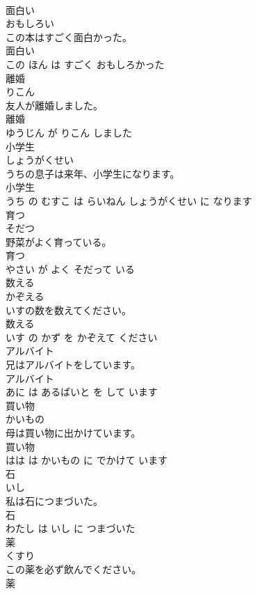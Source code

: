 \documentclass[8pt]{extreport}
\begin{document}
\begin{CJK}{UTF8}{min}
\\	面白い	
\\	おもしろい			
\\	この本はすごく面白かった。	
\\	面白い 
\\	この ほん は すごく おもしろかった			
\\	離婚	
\\	りこん			
\\	友人が離婚しました。	
\\	離婚 
\\	ゆうじん が りこん しました			
\\	小学生	
\\	しょうがくせい			
\\	うちの息子は来年、小学生になります。	
\\	小学生 
\\	うち の むすこ は らいねん しょうがくせい に なります			
\\	育つ	
\\	そだつ			
\\	野菜がよく育っている。	
\\	育つ 
\\	やさい が よく そだって いる			
\\	数える	
\\	かぞえる			
\\	いすの数を数えてください。	
\\	数える 
\\	いす の かず を かぞえて ください			
\\	アルバイト	
\\	兄はアルバイトをしています。	
\\	アルバイト 
\\	あに は あるばいと を して います			
\\	買い物	
\\	かいもの			
\\	母は買い物に出かけています。	
\\	買い物 
\\	はは は かいもの に でかけて います			
\\	石	
\\	いし			
\\	私は石につまづいた。	
\\	石 
\\	わたし は いし に つまづいた			
\\	薬	
\\	くすり			
\\	この薬を必ず飲んでください。	
\\	薬 

\end{CJK}
\end{document}
